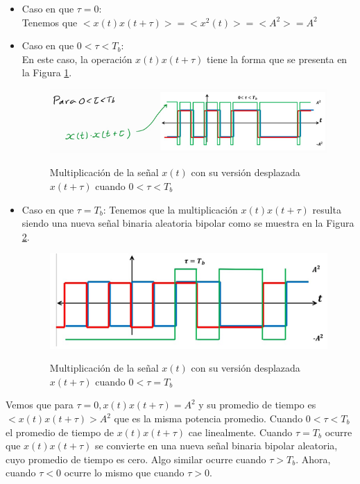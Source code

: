 \begin{itemize}
    \item Caso en que $\tau = 0$:\\
Tenemos que $<x(t) x(t + \tau )> =<x^{2}(t)>=<A^{2}>=A^{2}$
    \item Caso en que $0<\tau<T_b$:\\
En este caso, la operación $x(t)x(t+\tau)$ tiene la forma que se presenta en la Figura \ref{fig:Ejemplo2}.
\begin{figure}[h!]
	\captionsetup{justification = raggedright, singlelinecheck = false}
	\caption{Multiplicación de la señal $x(t)$ con su versión desplazada $x(t+\tau)$ cuando $0<\tau < T_b$}
	\centering
	\includegraphics[scale=1]{Imagenes/Ejemplo2.png}
	\label{fig:Ejemplo2}
\end{figure}
    \item Caso en que  $ \tau = T_{b}$:
Tenemos que la multiplicación $x(t)x(t+\tau)$ resulta siendo una nueva señal binaria aleatoria bipolar como se muestra en la Figura \ref{fig:Ejemplo3}.
\begin{figure}[h!]
	\captionsetup{justification = raggedright, singlelinecheck = false}
	\caption{Multiplicación de la señal $x(t)$ con su versión desplazada $x(t+\tau)$ cuando $0<\tau = T_b$}
	\centering
	\includegraphics[scale=0.9]{Imagenes/Ejemplo3.png}
	\label{fig:Ejemplo3}
\end{figure}
\end{itemize}

Vemos que para $ \tau = 0, x(t)x(t + \tau ) = A^{2}$ y su promedio de tiempo es $<x(t)x(t+\tau ) > A^{2}$ que es la misma potencia promedio. Cuando $0 < \tau < T_{b}$ el promedio de tiempo de $x(t)x(t+\tau)$ cae linealmente.
Cuando $ \tau = T_{b}$  ocurre que $x(t)x(t + \tau)$ se convierte en una nueva señal binaria bipolar aleatoria, cuyo promedio de tiempo es cero. Algo similar ocurre cuando $\tau > T_{b}$.
Ahora, cuando $\tau < 0$ ocurre lo mismo que cuando $\tau > 0$.


